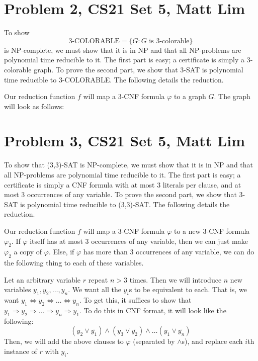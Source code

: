 \documentclass{article}
\begin{document}
\newpage

\section*{Problem 2, CS21 Set 5, Matt Lim}
To show
\[ \text{3-COLORABLE} = \{G : G \text{ is 3-colorable}\} \]
is NP-complete, we must show that it is in NP and that all NP-problems are
polynomial time reducible to it. The first part is easy; a certificate is simply
a 3-colorable graph. To prove the second part, we show that 3-SAT is polynomial
time reducible to 3-COLORABLE. The following details the reduction.

Our reduction function $f$ will map a 3-CNF formula $\varphi$ to a graph $G$.
The graph will look as follows:
\newpage

\section*{Problem 3, CS21 Set 5, Matt Lim}
To show that (3,3)-SAT is NP-complete, we must show that it is in NP and that
all NP-problems are polynomial time reducible to it. The first part is easy;
a certificate is simply a CNF formula with at most 3 literals per clause, and
at most 3 occurrences of any variable. To prove the second part, we show that
3-SAT is polynomial time reducible to (3,3)-SAT. The following details the
reduction.

Our reduction function $f$ will map a 3-CNF formula $\varphi$ to a new 3-CNF
formula $\varphi_{2}$. If $\varphi$ itself has at most 3 occurrences of any
variable, then we can just make $\varphi_{2}$ a copy of $\varphi$. Else, if
$\varphi$ has more than 3 occurrences of any variable, we can do the following
thing to each of these variables.

Let an arbitrary variable $r$ repeat $n > 3$ times. Then we will introduce
$n$ new variables $y_{1}, y_{2}, \dots , y_{n}$. We want all the $y_{i}$s to
be equivalent to each. That is, we want $y_{1} \Leftrightarrow y_{2}
\Leftrightarrow \dots \Leftrightarrow y_{n}$. To get this, it suffices to show
that $y_{1} \Rightarrow y_{2} \Rightarrow \dots \Rightarrow y_{n} \Rightarrow
y_{1}$. To do this in CNF format, it will look like the following:
\[ (y_{2} \vee \overline{y_{1}}) \wedge (y_{3} \vee \overline{y_{2}})
\wedge \dots (y_{1} \vee \overline{y_{n}}) \]
Then, we will add the above clauses to $\varphi$ (separated by $\wedge$s), and
replace each $i$th instance of $r$ with $y_{i}$.
\end{document}
